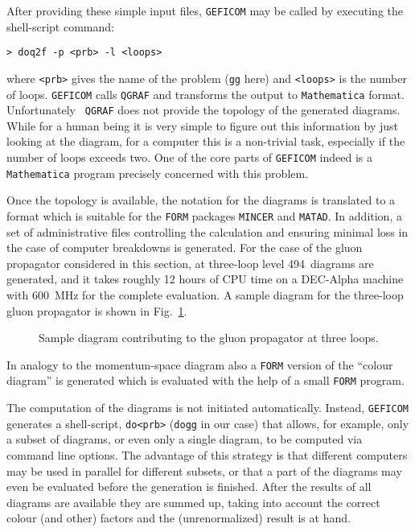 After providing these simple input files,
{\tt GEFICOM} may be called by executing the shell-script
command:
\begin{verbatim}
> doq2f -p <prb> -l <loops>
\end{verbatim}
where \verb/<prb>/ gives the name of the problem ({\tt gg} here) and
\verb/<loops>/ is the number of loops. {\tt GEFICOM} calls {\tt QGRAF}
and transforms the output to {\tt Mathematica} format. Unfortunately {\tt
  QGRAF} does not provide the topology of the generated diagrams.
While for a human being it is very simple
to figure out this information by just looking at the diagram, for a
computer this is a non-trivial task, especially if the number of
loops exceeds two.  One of the core parts of {\tt GEFICOM} indeed is a
{\tt Mathematica} program precisely concerned with this problem. 

Once the topology is available, the notation for the diagrams is
translated to a format which is suitable for the {\tt FORM} packages
{\tt MINCER} and {\tt MATAD}. In addition, a set of administrative files
controlling the calculation and ensuring minimal loss in the case of
computer breakdowns is generated.  For the case of the gluon propagator
considered in this section, at three-loop level 494~diagrams are
generated, and it takes roughly 12 hours of CPU time on a DEC-Alpha
machine with 600~MHz for the complete evaluation. A sample diagram for
the three-loop gluon propagator is shown in Fig.~\ref{fig::gg}.

%
\begin{figure}[ht]
  \begin{center}
    \leavevmode
    \hfill
    \parbox{\captionwidth}{
    \caption[]{\label{fig::gg}\sloppy
      Sample diagram contributing to the gluon propagator at three loops.
      }}
  \end{center}
\end{figure}
%


In analogy to the momentum-space diagram also a {\tt FORM} version of the
``colour diagram'' is generated which is evaluated with the help of
a small {\tt FORM} program.

The computation of the diagrams is not initiated automatically.
Instead, {\tt GEFICOM} generates a shell-script, \verb/do<prb>/
(\verb/dogg/ in our case) that allows, for example, only a subset of
diagrams, or even only a single diagram, to be computed via command line
options.  The advantage of this strategy is that different computers may
be used in parallel for different subsets, or that a part of the
diagrams may even be evaluated before the generation is finished.  After
the results of all diagrams are available they are summed up, taking
into account the correct colour (and other) factors and the
(unrenormalized) result is at hand.

